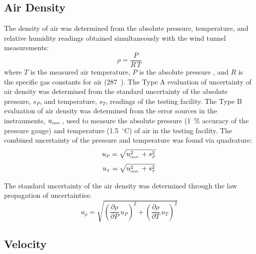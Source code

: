 \documentclass[12pt]{article}
\begin{document}
\subsection{Air Density}
\label{ssec:ADUncertainty}

The density of air was determined from the absolute pressure, temperature, and relative humidity readings obtained simultaneously with the wind tunnel measurements:
\begin{equation}
\rho  =  \frac{P}{R\,T}
\end{equation}
where $T$ is the measured air temperature, $P$ is the absolute pressure , and  $R$ is the specific gas constants for air (287~\si{}). The Type A evaluation of uncertainty of air density was determined from the standard uncertainty of the absolute pressure, $s_{\scriptscriptstyle P}$, and temperature, $s_{\scriptscriptstyle T}$, readings of the testing facility. The Type B evaluation of air density was determined from the error sources in the instrauments, $u_{\rm \scriptscriptstyle inst.}$, used to measure the absolute pressure (1~\% accuracy of the pressure gauge) and temperature (1.5~$^\circ$C) of air in the testing facility. The combined uncertainty of the pressure and temperature was found via quadrature:
\begin{equation}
\label{eq:abspressureuncertainty}
u_{\scriptscriptstyle P} = \sqrt{ u_{\rm \scriptscriptstyle inst.}^2 + s_{\scriptscriptstyle P}^2}
\end{equation}
\begin{equation}
\label{eq:tempuncertainty}
u_{\scriptscriptstyle T} = \sqrt{ u_{\rm \scriptscriptstyle inst.}^2 + s_{\scriptscriptstyle T}^2}
\end{equation}

The standard uncertainty of the air density was determined through the law propagation of uncertainties:
\begin{equation}
\label{eq:Densityuncertainty}
u_{\scriptscriptstyle \rho} = \sqrt{{\left( \frac{\partial \rho}{\partial P}\,u_{\scriptscriptstyle P} \right) }^2+{\left(\frac{\partial \rho}{\partial T}\,u_{\scriptscriptstyle T}\right)}^2}
\end{equation}

\subsection{Velocity}
\label{ssec:VelUncertainty}
\end{document}
